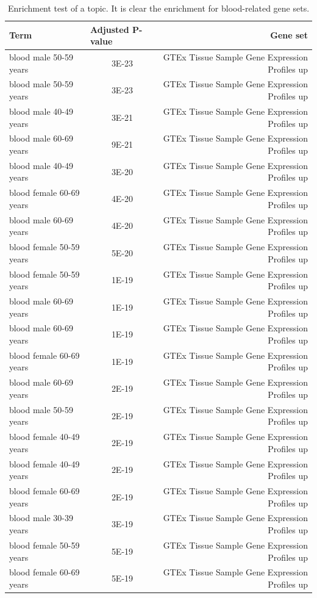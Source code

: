 \begin{table}[htb!]
	\centering
	\tiny
	\begin{tabular}{|l|c|r|}
		\hline
		Term & \multicolumn{1}{l|}{Adjusted P-value} & Gene set \\ \hline
		blood male 50-59 years & 3E-23 & GTEx Tissue Sample Gene Expression Profiles up \\ \hline
		blood male 50-59 years & 3E-23 & GTEx Tissue Sample Gene Expression Profiles up \\ \hline
		blood male 40-49 years & 3E-21 & GTEx Tissue Sample Gene Expression Profiles up \\ \hline
		blood male 60-69 years & 9E-21 & GTEx Tissue Sample Gene Expression Profiles up \\ \hline
		blood male 40-49 years & 3E-20 & GTEx Tissue Sample Gene Expression Profiles up \\ \hline
		blood female 60-69 years & 4E-20 & GTEx Tissue Sample Gene Expression Profiles up \\ \hline
		blood male 60-69 years & 4E-20 & GTEx Tissue Sample Gene Expression Profiles up \\ \hline
		blood female 50-59 years & 5E-20 & GTEx Tissue Sample Gene Expression Profiles up \\ \hline
		blood female 50-59 years & 1E-19 & GTEx Tissue Sample Gene Expression Profiles up \\ \hline
		blood male 60-69 years & 1E-19 & GTEx Tissue Sample Gene Expression Profiles up \\ \hline
		blood male 60-69 years & 1E-19 & GTEx Tissue Sample Gene Expression Profiles up \\ \hline
		blood female 60-69 years & 1E-19 & GTEx Tissue Sample Gene Expression Profiles up \\ \hline
		blood male 60-69 years & 2E-19 & GTEx Tissue Sample Gene Expression Profiles up \\ \hline
		blood male 50-59 years & 2E-19 & GTEx Tissue Sample Gene Expression Profiles up \\ \hline
		blood female 40-49 years & 2E-19 & GTEx Tissue Sample Gene Expression Profiles up \\ \hline
		blood female 40-49 years & 2E-19 & GTEx Tissue Sample Gene Expression Profiles up \\ \hline
		blood female 60-69 years & 2E-19 & GTEx Tissue Sample Gene Expression Profiles up \\ \hline
		blood male 30-39 years & 3E-19 & GTEx Tissue Sample Gene Expression Profiles up \\ \hline
		blood female 50-59 years & 5E-19 & GTEx Tissue Sample Gene Expression Profiles up \\ \hline
		blood female 60-69 years & 5E-19 & GTEx Tissue Sample Gene Expression Profiles up \\ \hline
	\end{tabular}
	\caption{Enrichment test of a topic. It is clear the enrichment for blood-related gene sets.}
		\label{tab:topic/enrich/blood}
\end{table}
